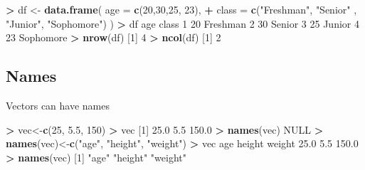 \documentclass[]{article}
\newenvironment{Shaded}{\begin{snugshade}}{\end{snugshade}}
\newcommand{\KeywordTok}[1]{\textcolor[rgb]{0.13,0.29,0.53}{\textbf{#1}}}
\newcommand{\DataTypeTok}[1]{\textcolor[rgb]{0.13,0.29,0.53}{#1}}
\newcommand{\DecValTok}[1]{\textcolor[rgb]{0.00,0.00,0.81}{#1}}
\newcommand{\FloatTok}[1]{\textcolor[rgb]{0.00,0.00,0.81}{#1}}
\newcommand{\StringTok}[1]{\textcolor[rgb]{0.31,0.60,0.02}{#1}}
\newcommand{\OtherTok}[1]{\textcolor[rgb]{0.56,0.35,0.01}{#1}}
\newcommand{\OperatorTok}[1]{\textcolor[rgb]{0.81,0.36,0.00}{\textbf{#1}}}
\newcommand{\NormalTok}[1]{#1}
\begin{document}
\begin{Shaded}
\begin{Highlighting}[]
\OperatorTok{>}\StringTok{ }\NormalTok{df <-}\StringTok{ }\KeywordTok{data.frame}\NormalTok{( }\DataTypeTok{age =} \KeywordTok{c}\NormalTok{(}\DecValTok{20}\NormalTok{,}\DecValTok{30}\NormalTok{,}\DecValTok{25}\NormalTok{, }\DecValTok{23}\NormalTok{), }
\OperatorTok{+}\StringTok{                   }\DataTypeTok{class =} \KeywordTok{c}\NormalTok{(}\StringTok{"Freshman"}\NormalTok{, }\StringTok{"Senior"}\NormalTok{ , }\StringTok{"Junior"}\NormalTok{, }\StringTok{"Sophomore"}\NormalTok{) )}
\OperatorTok{>}\StringTok{ }\NormalTok{df}
\NormalTok{  age     class}
\DecValTok{1}  \DecValTok{20}\NormalTok{  Freshman}
\DecValTok{2}  \DecValTok{30}\NormalTok{    Senior}
\DecValTok{3}  \DecValTok{25}\NormalTok{    Junior}
\DecValTok{4}  \DecValTok{23}\NormalTok{ Sophomore}
\OperatorTok{>}\StringTok{ }\KeywordTok{nrow}\NormalTok{(df) }
\NormalTok{[}\DecValTok{1}\NormalTok{] }\DecValTok{4}
\OperatorTok{>}\StringTok{ }\KeywordTok{ncol}\NormalTok{(df) }
\NormalTok{[}\DecValTok{1}\NormalTok{] }\DecValTok{2}
\end{Highlighting}
\end{Shaded}

\subsection{Names}\label{names}

Vectors can have names

\begin{Shaded}
\begin{Highlighting}[]
\OperatorTok{>}\StringTok{ }\NormalTok{vec<-}\KeywordTok{c}\NormalTok{(}\DecValTok{25}\NormalTok{, }\FloatTok{5.5}\NormalTok{, }\DecValTok{150}\NormalTok{)}
\OperatorTok{>}\StringTok{ }\NormalTok{vec}
\NormalTok{[}\DecValTok{1}\NormalTok{]  }\FloatTok{25.0}   \FloatTok{5.5} \FloatTok{150.0}
\OperatorTok{>}\StringTok{ }\KeywordTok{names}\NormalTok{(vec)}
\OtherTok{NULL}
\OperatorTok{>}\StringTok{ }\KeywordTok{names}\NormalTok{(vec)<-}\KeywordTok{c}\NormalTok{(}\StringTok{"age"}\NormalTok{, }\StringTok{"height"}\NormalTok{, }\StringTok{"weight"}\NormalTok{)}
\OperatorTok{>}\StringTok{ }\NormalTok{vec}
\NormalTok{   age height weight }
  \FloatTok{25.0}    \FloatTok{5.5}  \FloatTok{150.0} 
\OperatorTok{>}\StringTok{ }\KeywordTok{names}\NormalTok{(vec)}
\NormalTok{[}\DecValTok{1}\NormalTok{] }\StringTok{"age"}    \StringTok{"height"} \StringTok{"weight"}
\end{Highlighting}
\end{Shaded}
\end{document}
